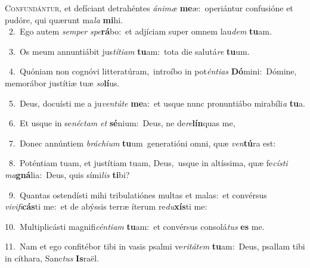 \lettrine{\initial\textcolor{\initialcolor}{C}}{onfundántur,} et defíciant detrahéntes \textit{á}\-\textit{ni}\textit{mæ} \textbf{me}\-æ:~\star operiántur confusióne et pudóre, qui quærunt ma\textit{la} \textbf{mi}\-hi.\\
{\numbfont\textcolor{\numbcolor}{~2.}}~Ego autem \textit{sem}\-\textit{per} \textit{spe}\-\textbf{rá}bo:~\star et adjíciam super omnem lau\textit{dem} \textbf{tu}\-am.\par
{\numbfont\textcolor{\numbcolor}{~3.}}~Os meum annuntiábit jus\-\textit{tí}\-\textit{ti}\textit{am} \textbf{tu}\-am:~\star tota die salutá\textit{re} \textbf{tu}\-um.\par
{\numbfont\textcolor{\numbcolor}{~4.}}~Quóniam non cognóvi litteratúram,~\dagger introíbo in pot\-\textit{én}\-\textit{ti}\textit{as} \textbf{Dó}\-mini:~\star Dómine, memorábor justítiæ tuæ \textit{so}\-\textbf{lí}us.\par
{\numbfont\textcolor{\numbcolor}{~5.}}~Deus, docuísti me a ju\-\textit{ven}\-\textit{tú}\textit{te} \textbf{me}\-a:~\star et usque nunc pronuntiábo mirabíli\textit{a} \textbf{tu}\-a.\par
{\numbfont\textcolor{\numbcolor}{~6.}}~Et usque in se\-\textit{néc}\-\textit{tam} \textit{et} \textbf{sé}\-nium:~\star Deus, ne de\-\textit{re}\-\textbf{lín}quas me,\par
{\numbfont\textcolor{\numbcolor}{~7.}}~Donec annúntiem \textit{brá}\-\textit{chi}\textit{um} \textbf{tu}\-um~\star generatióni omni, quæ \textit{ven}\-\textbf{tú}ra est:\par
{\numbfont\textcolor{\numbcolor}{~8.}}~Poténtiam tuam, et justítiam tuam, Deus,~\dagger usque in altíssima, quæ fe\-\textit{cís}\-\textit{ti} \textit{ma}\-\textbf{gná}lia:~\star Deus, quis sími\textit{lis} \textbf{ti}\-bi?\par
{\numbfont\textcolor{\numbcolor}{~9.}}~Quantas ostendísti mihi tribulatiónes multas et malas:~\dagger et convérsus \textit{vi}\-\textit{vi}\textit{fi}\textbf{cás}ti me:~\star et de abýssis terræ íterum re\-\textit{du}\-\textbf{xís}ti me:\par
{\numbfont\textcolor{\numbcolor}{10.}}~Multiplicásti magnifi\-\textit{cén}\-\textit{ti}\textit{am} \textbf{tu}\-am:~\star et convérsus consolá\textit{tus} \textbf{es} me.\par
{\numbfont\textcolor{\numbcolor}{11.}}~Nam et ego confitébor tibi in vasis psalmi ve\-\textit{ri}\-\textit{tá}\textit{tem} \textbf{tu}\-am:~\star Deus, psallam tibi in cíthara, Sanc\textit{tus} \textbf{Is}\-raël.\par
